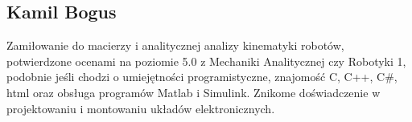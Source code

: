 \subsection{Kamil Bogus}
Zamiłowanie do macierzy i analitycznej analizy kinematyki robotów, potwierdzone ocenami na poziomie 5.0 z Mechaniki Analitycznej czy Robotyki 1, podobnie jeśli chodzi o umiejętności programistyczne, znajomość C, C++, C\#, html oraz obsługa programów Matlab i Simulink. Znikome doświadczenie w projektowaniu i montowaniu układów elektronicznych.
